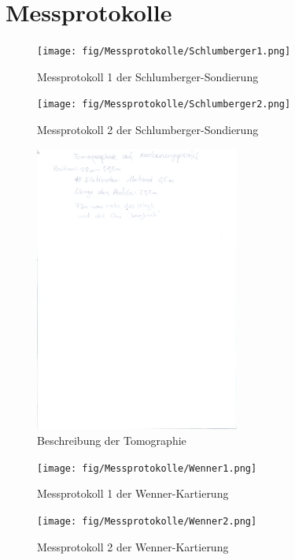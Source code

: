 \section{Messprotokolle}

\begin{figure}[ht]
\centering
\texttt{[image: fig/Messprotokolle/Schlumberger1.png]}
\caption{Messprotokoll 1 der Schlumberger-Sondierung}
\label{abb:Schlumberger1}
\end{figure}

\begin{figure}[ht]
\centering
\texttt{[image: fig/Messprotokolle/Schlumberger2.png]}
\caption{Messprotokoll 2 der Schlumberger-Sondierung}
\label{abb:Schlumberger2}
\end{figure}

\begin{figure}[ht]
\centering
\includegraphics[width=0.6\textwidth]{fig/Messprotokolle/Tomographie.png}
\caption{Beschreibung der Tomographie}
\label{abb:AnhTomographie}
\end{figure}

\begin{figure}[ht]
\centering
\texttt{[image: fig/Messprotokolle/Wenner1.png]}
\caption{Messprotokoll 1 der Wenner-Kartierung}
\label{abb:Wenner1}
\end{figure}

\begin{figure}[ht]
\centering
\texttt{[image: fig/Messprotokolle/Wenner2.png]}
\caption{Messprotokoll 2 der Wenner-Kartierung}
\label{abb:Wenner2}
\end{figure}
